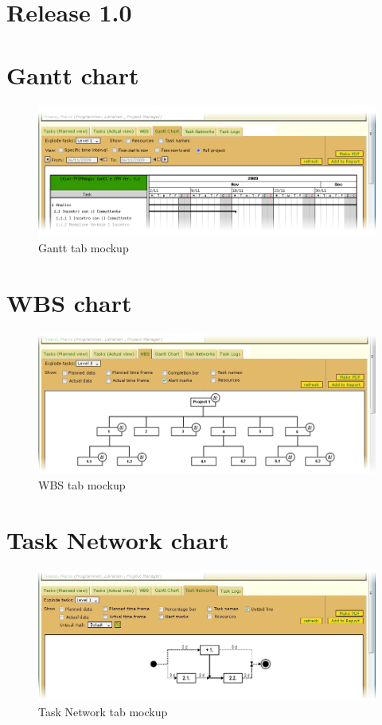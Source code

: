\chapter*{Release \textbf{1.0}}

\chapter{Gantt chart}

\begin{figure} 
\centering
\includegraphics[width=1\textwidth]{../Mockup/Gantt.png}
\caption{Gantt tab mockup}
\end{figure}

\chapter{WBS chart}

\begin{figure} 
\centering
\includegraphics[width=1\textwidth]{../Mockup/WBS.png}
\caption{WBS tab mockup}
\end{figure}

\chapter{Task Network chart}

\begin{figure} 
\centering
\includegraphics[width=1\textwidth]{../Mockup/TN.png}
\caption{Task Network tab mockup}
\end{figure}